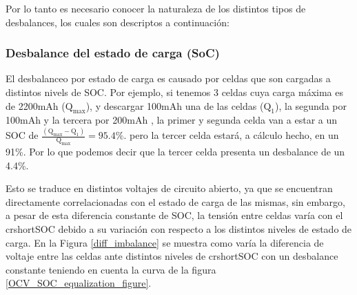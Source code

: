 \documentclass[10pt,a4paper]{article}
\begin{document}
	\noindent Por lo tanto es necesario conocer la naturaleza de los distintos tipos de desbalances, los cuales son descriptos a continuación:
	
	\subsubsection{Desbalance del estado de carga (SoC)}
	
	\noindent El desbalanceo por estado de carga es causado por celdas que son cargadas a distintos nivels de \acrshort{SOC}. Por ejemplo, si tenemos 3 celdas cuya carga máxima es de 2200mAh ($\mathrm{Q_{max}}$), y descargar 100mAh una de las celdas ($\mathrm{Q_1}$), la segunda por 100mAh y la tercera por 200mAh , la primer y segunda celda van a estar a un \acrshort{SOC} de $\mathrm{\frac{(Q_{max} - Q_1)}{Q_{max}} = 95.4\%}$. pero la tercer celda estará, a cálculo hecho, en un 91\%. Por lo que podemos decir que la tercer celda presenta un desbalance de un 4.4\%. 

    Esto se traduce en distintos voltajes de circuito abierto, ya que se encuentran directamente correlacionadas con el estado de carga de las mismas, sin embargo, a pesar de esta diferencia constante de \acrshort{SOC}, la tensión entre celdas varía con el crshort{SOC} debido a su variación con respecto a los distintos niveles de estado de carga. En la Figura \ref{diff_imbalance} se muestra como varía la diferencia de voltaje entre las celdas ante distintos niveles de crshort{SOC} con un desbalance constante teniendo en cuenta la curva de la figura \ref{OCV_SOC_equalization_figure}.
	
\end{document}
